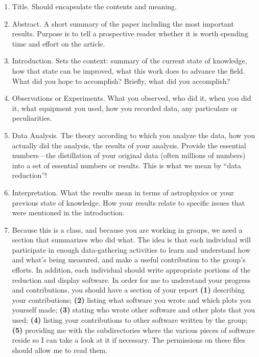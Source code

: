 \documentclass[12pt,preprint]{aastex}
\begin{document}
\begin{enumerate}

\item Title. Should encapsulate the contents and meaning.

\item Abstract. A short summary of the paper including the most important
  results.  Purpose is to tell a prospective reader whether it is worth
  spending time and effort on the article.
  
\item Introduction. Sets the context: summary of the current state of
  knowledge, how that state can be improved, what this work does to
  advance the field. What did you hope to accomplish? Briefly, what did you
  accomplish? 

\item Observations or Experiments. What you observed, who did it, when you
  did it, what equipment you used, how you recorded data, any particulars
  or peculiarities.

\item Data Analysis. The theory according to which you analyze the data,
  how you actually did the analysis, the results of your analysis. Provide
  the essential numbers---the distillation of your original data (often
  millions of numbers) into a set of essential numbers or results. This is
  what we mean by ``data reduction''!

\item Interpretation. What the results mean in terms of astrophysics or
  your previous state of knowledge. How your results relate to specific
  issues that were mentioned in the introduction.

\item Because this is a class, and because you are working in groups, we
  need a section that summarizes who did what. The idea is that each
  individual will participate in enough data-gathering activities to
  learn and understand how and what's being measured, and make a useful
  contribution to the group's efforts. In addition, each individual
  should write appropriate portions of the reduction and display
  software. In order for me to understand your progress and
  contributions, you should have a section of your report {\bf (1)}
  describing your contributions; {\bf (2)} listing what software you
  wrote and which plots you yourself made; {\bf (3)} stating who wrote
  other software and other plots that you used; {\bf (4)} listing your
  contributions to other software written by the group; {\bf (5)}
  providing me with the subdirectories where the various pieces of
  software reside so I can take a look at it if necessary. The
  permissions on these files should allow me to read them.


\end{enumerate}
\end{document}

